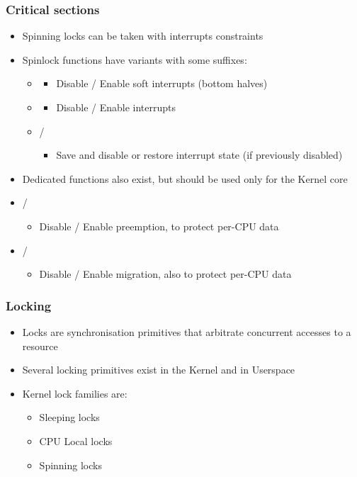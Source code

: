 \begin{frame}
	\frametitle{Critical sections}
	\begin{itemize}
		\item Spinning locks can be taken with interrupts constraints
		\item Spinlock functions have variants with some suffixes:
		\begin{itemize}
		\item {}
			\begin{itemize}
				\item Disable / Enable soft interrupts (bottom halves)
			\end{itemize}
		\item {}
			\begin{itemize}
				\item Disable / Enable interrupts
			\end{itemize}
		\item {} / 
			\begin{itemize}
				\item Save and disable or restore interrupt state (if previously disabled)
			\end{itemize}
		\end{itemize}
		\item Dedicated functions also exist, but should be used only for the Kernel core
		\item {} / 
			\begin{itemize}
				\item Disable / Enable preemption, to protect per-CPU data
			\end{itemize}
		\item {} / 
			\begin{itemize}
				\item Disable / Enable migration, also to protect per-CPU data
			\end{itemize}

	\end{itemize}
\end{frame}

\begin{frame}
  \frametitle{Locking}
	\begin{itemize}
		\item Locks are synchronisation primitives that arbitrate concurrent accesses to a resource
		\item Several locking primitives exist in the Kernel and in Userspace
		\item Kernel lock families are:
			\begin{itemize}
				\item Sleeping locks
				\item CPU Local locks
				\item Spinning locks
			\end{itemize}
	\end{itemize}
\end{frame}


